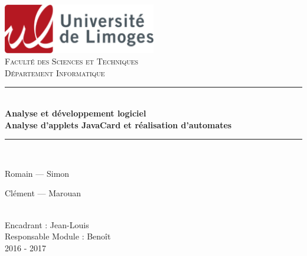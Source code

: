 \begin{titlepage}
\begin{center}

    \includegraphics[width=0.5\textwidth]{images/logo-ul.png} ~\\[1cm]
    \textsc{\LARGE Faculté des Sciences et Techniques} \\[0.5cm]
    \textsc{\Large Département Informatique} \\[1.5cm]

    \vspace*{3,5cm}

    \hrule height 0.05cm ~\\[0.4cm]
    {\huge \bfseries Analyse et développement logiciel} \\[0.5cm]
    {\LARGE \bfseries Analyse d'applets JavaCard et réalisation d'automates} \\[0.5cm]
    \hrule height 0.05cm ~\\[0.6cm]

    {\large Romain  ---
	Simon  
	
	
	
	Clément  ---
	Marouan  }

    ~\\[2cm]


    \vfill
    Encadrant : 	 Jean-Louis \\
	Responsable Module :  Benoît\\
    {\large  2016 - 2017 \\}

\end{center}
\end{titlepage}